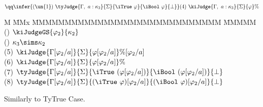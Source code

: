 \begin{flushleft}
\bigskip
$$
\qq	\infer
	{ (\un{1}) \
	  \tyJudge
		{\Gamma, \ a : \kappa_3}
		{\Sigma}
		{\iTrue \ \varphi}
		{\iBool \ \varphi}
		{\bot}
	}
	{ (4) \
	  \kiJudge
		{\Gamma, \ a : \kappa_3}
		{\Sigma}
		{\varphi}
		{\%}
	}	
$$
\begin{tabbing}
M \= MMx \= MMMMMMMMMMMMMMMMMMMMMMMMMMMMM \= MMMMM  \kill
\>	(\un{2}) 
		\> $\kiJudgeGS{\varphi_2}{\kappa_2}$
		\> 
\\[1ex]
\>	() 
		\> $\kappa_3 \sims \kappa_2$
		\> 
\\[1ex]
\>	(5) 	\> $\kiJudge
			{\Gamma[\varphi_2/a]}
			{\Sigma}
			{\varphi[\varphi_2/a]}
			{\%[\varphi_2/a]}$
		\> 
\\[1ex]
\>	(6) 	\> $\kiJudge
			{\Gamma[\varphi_2/a]}
			{\Sigma}
			{\varphi[\varphi_2/a]}
			{\%}$
		\> 
\\[1ex]
\>	(7) 	\> $\tyJudge
			{\Gamma[\varphi_2/a]}
			{\Sigma}
			{\iTrue \ (\varphi[\varphi_2/a])}
			{\iBool \ (\varphi[\varphi_2/a])}
			{\bot}$
		\> 
\\[1ex]
\>	(8) 	\> $\tyJudge
			{\Gamma[\varphi_2/a]}
			{\Sigma}
			{(\iTrue \ \varphi)[\varphi_2/a]}
			{(\iBool \ \varphi)[\varphi_2/a]}
			{\bot}$
		\> 
\end{tabbing}

\clearpage{}

Similarly to TyTrue Case.


\end{flushleft}
